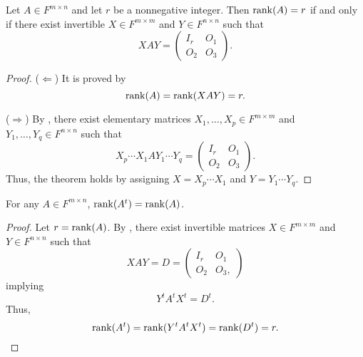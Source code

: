 \begin{corollary}
  \label{thm:sandwich}
  Let $A \in F^{m \times n}$ and let $r$ be a nonnegative integer.
  Then $\operatorname{rank}(A) = r$ if and only if there exist invertible
  $X \in F^{m \times m}$ and $Y \in F^{n \times n}$ such that
  \begin{equation*}
    XAY =
    \begin{pmatrix}
      I_r & O_1 \\
      O_2 & O_3
    \end{pmatrix}.
  \end{equation*}
\end{corollary}
\begin{proof}
  ($\Leftarrow$)
  It is proved by
  \begin{equation*}
    \operatorname{rank}(A) = \operatorname{rank}(XAY) = r.
  \end{equation*}

  ($\Rightarrow$)
  By , there exist elementary matrices
  $X_1, \dots, X_p \in F^{m \times m}$ and $Y_1, \dots, Y_q \in F^{n \times n}$
  such that
  \begin{equation*}
    X_p \cdots X_1 A Y_1 \cdots Y_q =
    \begin{pmatrix}
      I_r & O_1 \\
      O_2 & O_3
    \end{pmatrix}.
  \end{equation*}
  Thus, the theorem holds by assigning
  $X = X_p \cdots X_1$ and $Y = Y_1 \cdots Y_q$.
\end{proof}

\begin{theorem}
  For any $A \in F^{m \times n}$, $\operatorname{rank}(A^t) = \operatorname{rank}(A)$.
\end{theorem}
\begin{proof}
  Let $r = \operatorname{rank}(A)$.
  By , there exist invertible matrices
  $X \in F^{m \times m}$ and $Y \in F^{n \times n}$ such that
  \begin{equation*}
    XAY = D =
    \begin{pmatrix}
      I_r & O_1 \\
      O_2 & O_3,
    \end{pmatrix}
  \end{equation*}
  implying
  \begin{equation*}
    Y^tA^tX^t = D^t.
  \end{equation*}
  Thus,
  \begin{equation*}
    \operatorname{rank}(A^t) = \operatorname{rank}(Y^tA^tX^t) = \operatorname{rank}(D^t) = r.
    \qedhere
  \end{equation*}
\end{proof}

